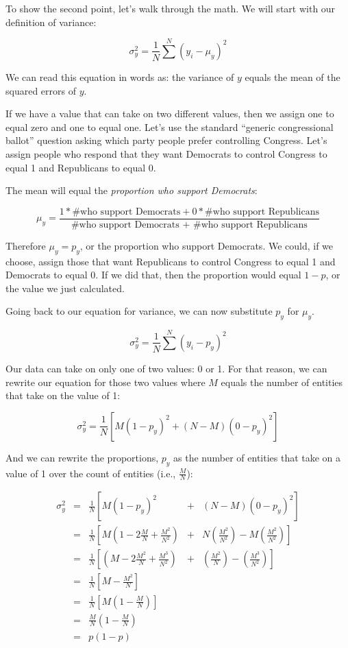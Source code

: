 \documentclass[11pt]{lecturenotes}
\begin{document}
To show the second point, let's walk through the math. We will start with our definition of variance: 

\[ \sigma_y^2 = \frac{1}{N}\sum^N\left(y_i - \mu_y\right)^2 \]

We can read this equation in words as: the variance of $y$ equals the mean of the squared errors of $y$. 

If we have a value that can take on two different values, then we assign one to equal zero and one to equal one. Let's use the standard ``generic congressional ballot'' question asking which party people prefer controlling Congress. Let's assign people who respond that they want Democrats to control Congress to equal 1 and Republicans to equal 0. 

The mean will equal the \emph{proportion who support Democrats}: 

\[ \mu_y = \frac{1*\text{\# who support Democrats} + 0*\text{\# who support Republicans}}{\text{\# who support Democrats + \# who support Republicans}} \]

Therefore $\mu_y = p_y$, or the proportion who support Democrats. We could, if we choose, assign those that want Republicans to control Congress to equal 1 and Democrats to equal 0. If we did that, then the proportion would equal $1-p$, or the value we just calculated. 

Going back to our equation for variance, we can now substitute $p_y$ for $\mu_y$. 

\[ \sigma_y^2 = \frac{1}{N}\sum^N\left(y_i - p_y\right)^2 \]

Our data can take on only one of two values: 0 or 1. For that reason, we can rewrite our equation for those two values where $M$ equals the number of entities that take on the value of 1:

\[ \sigma_y^2 = \frac{1}{N}\left[M\left(1 - p_y\right)^2 + (N-M)\left(0 - p_y\right)^2\right]  \]

And we can rewrite the proportions, $p_y$ as the number of entities that take on a value of 1 over the count of entities (i.e., $\frac{M}{N}$): 

\begin{equation*}
\begin{array}{rclcr}
\sigma_y^2 & = &\frac{1}{N} \left[M\left(1 - p_y\right)^2\right. &+& \left.(N-M)\left(0 - p_y\right)^2\right] \\
& =& \frac{1}{N}  \left[M\left(1 - 2\frac{M}{N} + \frac{M^2}{N^2}\right)\right. &+& \left.N\left(\frac{M^2}{N^2}\right) -M\left(\frac{M^2}{N^2}\right)\right] \\
& =& \frac{1}{N}  \left[\left(M - 2\frac{M^2}{N} + \frac{M^3}{N^2}\right)\right. &+& \left.\left(\frac{M^2}{N}\right) - \left(\frac{M^3}{N^2}\right)\right] \\
& =& \frac{1}{N}  \left[M - \frac{M^2}{N}\right] && \\
& =& \frac{1}{N}  \left[M\left( 1 - \frac{M}{N}\right)\right] && \\
& =&  \frac{M}{N}\left( 1 - \frac{M}{N}\right) && \\
& = &  p\left(1 - p\right) && 
\end{array}
\end{equation*}
\end{document}
